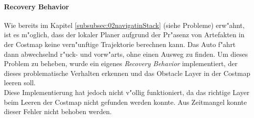 \paragraph{Recovery Behavior}
Wie bereits im Kapitel \ref{subsubsec:02navigatinStack} (siehe Probleme) erw"ahnt, ist es m"oglich, dass der lokaler Planer aufgrund der Pr"asenz von Artefakten in der Costmap keine vern"unftige Trajektorie berechnen kann. Das Auto f"ahrt dann abwechselnd r"uck- und vorw"arts, ohne einen Ausweg zu finden. Um dieses Problem zu beheben, wurde ein eigenes \emph{Recovery Behavior} implementiert, der dieses problematische Verhalten erkennen und das Obstacle Layer in der Costmap leeren soll.\\
Diese Implementierung hat jedoch nicht v"ollig funktioniert, da das richtige Layer beim Leeren der Costmap nicht gefunden werden konnte. Aus Zeitmangel konnte dieser Fehler nicht behoben werden.